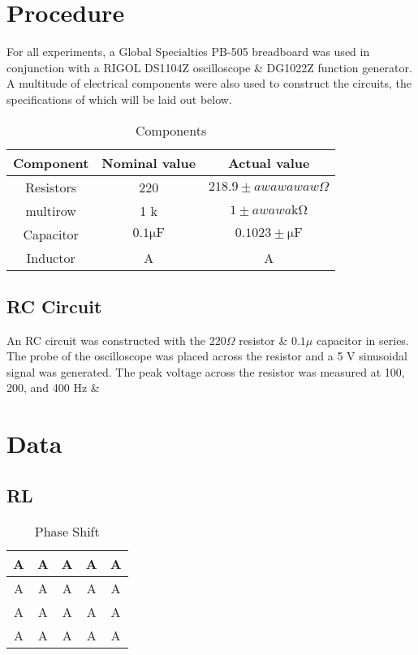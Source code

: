 \documentclass{article}
\begin{document}
	\section{Procedure}
		For all experiments, a Global Specialties PB-505 breadboard was used in conjunction with a RIGOL DS1104Z oscilloscope \& DG1022Z function generator. A multitude of electrical components were also used to construct the circuits, the specifications of which will be laid out below.
		\begin{table}[htbp]
	\centering
	\caption{Components}
	\begin{tabular}{ccc}
		\hline
		Component & Nominal value & Actual value \\ \hline
		Resistors & 220 \textOmega & $218.9  \pm awawawaw\Omega$ \\
		multirow & 1 k\textOmega & $1 \pm awawa\mathrm{k\Omega}$ \\
		Capacitor & $0.1 \mathrm{\mu F}$ & $0.1023 \pm \mathrm{\mu F}$ \\
		Inductor & A & A \\ \hline
	\end{tabular}
\end{table}

		\subsection{RC Circuit}
			An RC circuit was constructed with the $220 \Omega$ resistor \& $0.1 \mu$ capacitor in series. The probe of the oscilloscope was placed across the resistor and a 5 V sinusoidal signal was generated. The peak voltage across the resistor was measured at 100, 200, and 400 Hz \&


	\section{Data}
		\subsection{RL}
			\begin{table}[htbp]
	\centering
	\caption{Phase Shift}
	\begin{tabular}{ccccc}
		\hline
		A & A & A & A & A \\ \hline
		A & A & A & A & A \\
		A & A & A & A & A \\
		A & A & A & A & A \\ \hline
	\end{tabular}
\end{table}
\end{document}
